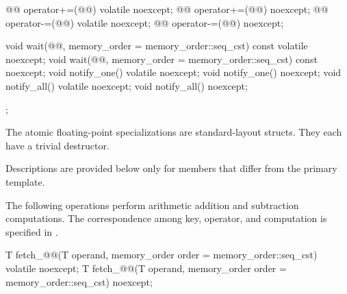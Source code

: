\begin{codeblock}
{{    @@ operator+=(@@) volatile noexcept;
    @@ operator+=(@@) noexcept;
    @@ operator-=(@@) volatile noexcept;
    @@ operator-=(@@) noexcept;

    void wait(@@, memory_order = memory_order::seq_cst) const volatile noexcept;
    void wait(@@, memory_order = memory_order::seq_cst) const noexcept;
    void notify_one() volatile noexcept;
    void notify_one() noexcept;
    void notify_all() volatile noexcept;
    void notify_all() noexcept;
  };
}
\end{codeblock}

\pnum
The atomic floating-point specializations
are standard-layout structs.
They each have
a trivial destructor.

\pnum
Descriptions are provided below only for members that differ from the primary template.

\pnum
The following operations perform arithmetic addition and subtraction computations.
The correspondence among key, operator, and computation is specified
in .

%
%
%
%
%
%
\begin{itemdecl}
T fetch_@@(T operand, memory_order order = memory_order::seq_cst) volatile noexcept;
T fetch_@@(T operand, memory_order order = memory_order::seq_cst) noexcept;
\end{itemdecl}

